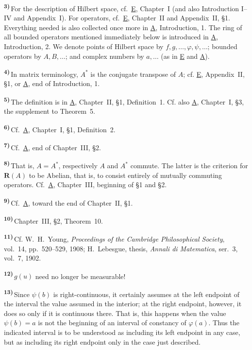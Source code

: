 \documentclass[12pt,b5paper,twoside]{article}
\newcommand{\originalnote}[1]{%
  \par\smallskip\noindent\hypertarget{note:#1}{\textsuperscript{\textbf{#1)}}}\,}
\begin{document}
\originalnote{3}For the description of Hilbert space, cf.\ \hyperref[ref:E]{E}, Chapter~I (and also
Introduction I--IV and Appendix~I).  For operators, cf.\ \hyperref[ref:E]{E}, Chapter~II and Appendix~II,
\S1.  Everything needed is also collected once more in \hyperref[ref:A]{A}, Introduction, 1.  The ring
of all bounded operators mentioned immediately below is introduced in \hyperref[ref:A]{A},
Introduction, 2.  We denote points of Hilbert space by
$f,g,\ldots,\varphi,\psi,\ldots$; bounded operators by $A,B,\ldots$; and complex
numbers by $a,\ldots$ (as in \hyperref[ref:E]{E} and \hyperref[ref:A]{A}).

\originalnote{4}In matrix terminology, $A^*$ is the conjugate transpose of $A$; cf.
 \hyperref[ref:E]{E}, Appendix~II, \S1, or \hyperref[ref:A]{A}, end of Introduction, 1.

\originalnote{5}The definition is in \hyperref[ref:A]{A}, Chapter~II, \S1, Definition~1.  Cf. also
\hyperref[ref:A]{A},
Chapter~I, \S3, the supplement to Theorem~5.

\originalnote{6}Cf.\ \hyperref[ref:A]{A}, Chapter~I, \S1, Definition~2.

\originalnote{7}Cf.\ \hyperref[ref:A]{A}, end of Chapter~III, \S2.

\originalnote{8}That is, $A=A^*$, respectively $A$ and $A^*$ commute.  The latter is
the criterion for $\mathbf R(A)$ to be Abelian, that is, to consist entirely of
mutually commuting operators.  Cf.\ \hyperref[ref:A]{A}, Chapter~III, beginning of \S1 and \S2.

\originalnote{9}Cf.\ \hyperref[ref:A]{A}, toward the end of Chapter~II, \S1.

\originalnote{10}Chapter~III, \S2, Theorem~10.

\originalnote{11}Cf. W.~H.~Young, \emph{Proceedings of the Cambridge Philosophical
Society}, vol.~14, pp.~520--529, 1908; H.~Lebesgue, thesis, \emph{Annali di
Matematica}, ser.~3, vol.~7, 1902.

\originalnote{12}$g(u)$ need no longer be measurable!

\originalnote{13}Since $\psi(b)$ is right-continuous, it certainly assumes
at the left endpoint of the interval the value assumed in the interior; at the right
endpoint, however, it does so only if it is continuous there.  That is, this happens
when the value $\psi(b)=a$ is not the beginning of an interval of constancy of
$\varphi(a)$.  Thus the indicated interval is to be understood as including its left
endpoint in any case, but as including its right endpoint only in the case just
described.
\end{document}
